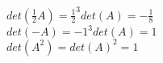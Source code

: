 \\
$det(\frac{1}{2}A) = \frac{1}{2}^3det(A) = -\frac{1}{8}$
\\
$det(-A) = -1^3det(A) = 1$
\\
$det(A^2) = det(A)^2 = 1$